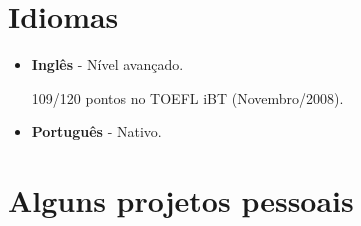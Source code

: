 \documentclass[a4paper,10pt]{article}
\begin{document}
  \section{Idiomas}
    \begin{itemize}
      \item  
        \textbf{Inglês} - Nível avançado.

        109/120 pontos no TOEFL iBT (Novembro/2008).

      \item  
        \textbf{Português} - Nativo.
    \end{itemize}



  \section{Alguns projetos pessoais}
\end{document}
